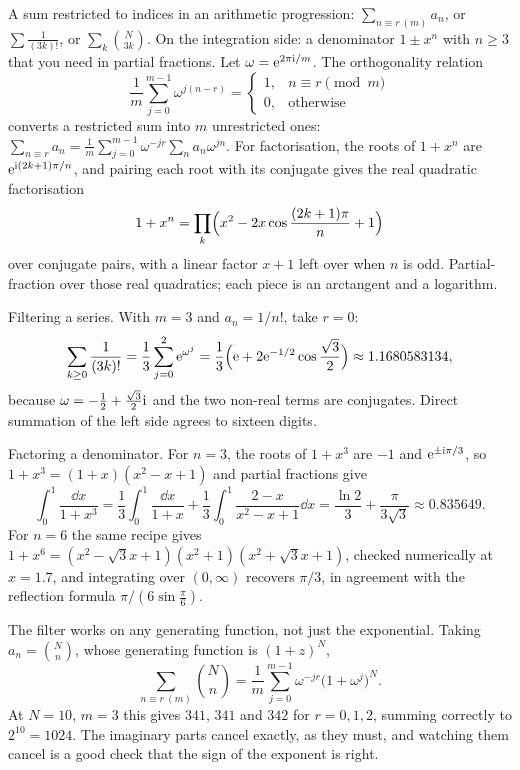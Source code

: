 \cue A sum restricted to indices in an arithmetic progression: $\sum_{n\equiv r\ (m)}a_n$, or $\sum\frac{1}{(3k)!}$, or $\sum_k\binom{N}{3k}$. On the integration side: a denominator $1\pm x^{n}$ with $n\geq3$ that you need in partial fractions.
\method Let $\omega=\mathrm{e}^{2\pi\mathrm{i}/m}$. The orthogonality relation
\[\frac1m\sum_{j=0}^{m-1}\omega^{j(n-r)}=\begin{cases}1,& n\equiv r\pmod m\\ 0,&\text{otherwise}\end{cases}\]
converts a restricted sum into $m$ unrestricted ones: $\sum_{n\equiv r}a_n=\frac1m\sum_{j=0}^{m-1}\omega^{-jr}\sum_n a_n\omega^{jn}$. For factorisation, the roots of $1+x^{n}$ are $\mathrm{e}^{\mathrm{i}(2k+1)\pi/n}$, and pairing each root with its conjugate gives the real quadratic factorisation
\[1+x^{n}=\prod_{k}\Bigl(x^{2}-2x\cos\frac{(2k+1)\pi}{n}+1\Bigr)\]
over conjugate pairs, with a linear factor $x+1$ left over when $n$ is odd. Partial-fraction over those real quadratics; each piece is an arctangent and a logarithm.

\begin{worked}
Filtering a series. With $m=3$ and $a_n=1/n!$, take $r=0$:
\[\sum_{k\geq0}\frac{1}{(3k)!}=\frac13\sum_{j=0}^{2}\mathrm{e}^{\omega^{j}}=\frac13\Bigl(\mathrm{e}+2\mathrm{e}^{-1/2}\cos\frac{\sqrt3}{2}\Bigr)\approx1.1680583134,\]
because $\omega=-\tfrac12+\tfrac{\sqrt3}{2}\mathrm{i}$ and the two non-real terms are conjugates. Direct summation of the left side agrees to sixteen digits.

Factoring a denominator. For $n=3$, the roots of $1+x^{3}$ are $-1$ and $\mathrm{e}^{\pm\mathrm{i}\pi/3}$, so $1+x^{3}=(1+x)(x^{2}-x+1)$ and partial fractions give
\[\int_0^1\frac{\dd x}{1+x^{3}}=\frac13\int_0^1\frac{\dd x}{1+x}+\frac13\int_0^1\frac{2-x}{x^{2}-x+1}\dd x=\frac{\ln2}{3}+\frac{\pi}{3\sqrt3}\approx0.835649.\]
For $n=6$ the same recipe gives $1+x^{6}=(x^{2}-\sqrt3x+1)(x^{2}+1)(x^{2}+\sqrt3x+1)$, checked numerically at $x=1.7$, and integrating over $(0,\infty)$ recovers $\pi/3$, in agreement with the reflection formula $\pi/(6\sin\tfrac\pi6)$.

The filter works on any generating function, not just the exponential. Taking $a_n=\binom{N}{n}$, whose generating function is $(1+z)^{N}$,
\[\sum_{n\equiv r\ (m)}\binom{N}{n}=\frac1m\sum_{j=0}^{m-1}\omega^{-jr}\bigl(1+\omega^{j}\bigr)^{N}.\]
At $N=10$, $m=3$ this gives $341$, $341$ and $342$ for $r=0,1,2$, summing correctly to $2^{10}=1024$. The imaginary parts cancel exactly, as they must, and watching them cancel is a good check that the sign of the exponent is right.
\end{worked}

